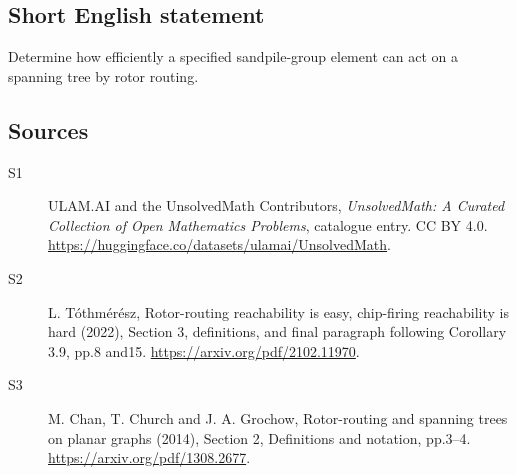 \documentclass[11pt]{article}
\begin{document}
\subsection{Short English statement}
Determine how efficiently a specified sandpile-group element can act on a spanning tree by rotor routing.
\subsection{Sources}
\begin{description}
\item[\hypertarget{source:statement:1}{S1}] ULAM.AI and the UnsolvedMath Contributors, \emph{UnsolvedMath: A Curated Collection of Open Mathematics Problems}, catalogue entry. CC BY 4.0. \url{https://huggingface.co/datasets/ulamai/UnsolvedMath}.
\item[\hypertarget{source:statement:2}{S2}] L. Tóthmérész, Rotor-routing reachability is easy, chip-firing reachability is hard (2022), Section 3, definitions, and final paragraph following Corollary 3.9, pp.8 and15. \url{https://arxiv.org/pdf/2102.11970}.
\item[\hypertarget{source:statement:3}{S3}] M. Chan, T. Church and J. A. Grochow, Rotor-routing and spanning trees on planar graphs (2014), Section 2, Definitions and notation, pp.3--4. \url{https://arxiv.org/pdf/1308.2677}.
\end{description}
\label{end:statement}
\end{document}
